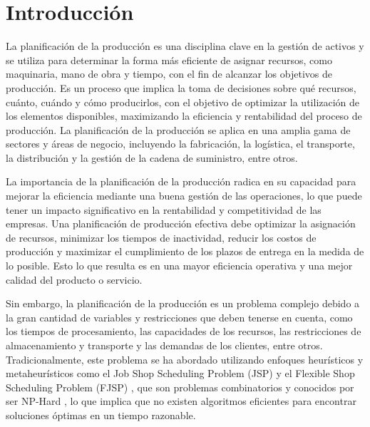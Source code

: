 \section{Introducción}
La planificación de la producción es una disciplina clave en la gestión de 
activos y se utiliza para determinar la forma más eficiente de asignar 
recursos, como maquinaria, mano de obra y tiempo, con el fin de alcanzar 
los objetivos de producción. Es un proceso que implica la toma de decisiones 
sobre qué recursos, cuánto, cuándo y cómo producirlos, con el objetivo de optimizar la 
utilización de los elementos disponibles, maximizando la eficiencia y rentabilidad 
del proceso de producción. La planificación de la producción se aplica en una 
amplia gama de sectores y áreas de negocio, incluyendo la fabricación, la logística, 
el transporte, la distribución y la gestión de la cadena de suministro, entre otros.\medskip

La importancia de la planificación de la producción radica en su capacidad para mejorar 
la eficiencia mediante una buena gestión de las operaciones, lo que puede tener un impacto 
significativo en la rentabilidad y competitividad de las empresas. Una planificación de 
producción efectiva debe optimizar la asignación de recursos, minimizar los tiempos de 
inactividad, reducir los costos de producción y maximizar el cumplimiento de los plazos 
de entrega en la medida de lo posible. Esto lo que resulta es en una mayor eficiencia operativa 
y una mejor calidad del producto o servicio.\medskip

Sin embargo, la planificación de la producción es un problema complejo debido a la gran 
cantidad de variables y restricciones que deben tenerse en cuenta, como los tiempos de 
procesamiento, las capacidades de los recursos, las restricciones de almacenamiento y 
transporte y las demandas de los clientes, entre otros. Tradicionalmente, este problema 
se ha abordado utilizando enfoques heurísticos y metaheurísticos como el Job Shop Scheduling 
Problem (JSP) y el Flexible Shop Scheduling Problem (FJSP) \cite{FJSP-article}, que son problemas 
combinatorios y conocidos por ser NP-Hard \cite{Derivando_2017}, lo que implica que no existen algoritmos eficientes 
para encontrar soluciones óptimas en un tiempo razonable.\medskip

